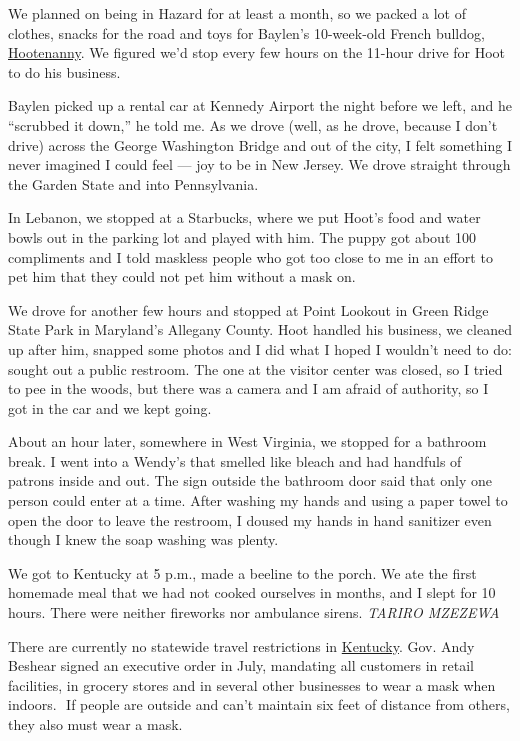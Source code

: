 We planned on being in Hazard for at least a month, so we packed a lot
of clothes, snacks for the road and toys for Baylen's 10-week-old French
bulldog, \href{https://www.instagram.com/hootboyblue/}{Hootenanny}. We
figured we'd stop every few hours on the 11-hour drive for Hoot to do
his business.

Baylen picked up a rental car at Kennedy Airport the night before we
left, and he ``scrubbed it down,'' he told me. As we drove (well, as he
drove, because I don't drive) across the George Washington Bridge and
out of the city, I felt something I never imagined I could feel --- joy
to be in New Jersey. We drove straight through the Garden State and into
Pennsylvania.

In Lebanon, we stopped at a Starbucks, where we put Hoot's food and
water bowls out in the parking lot and played with him. The puppy got
about 100 compliments and I told maskless people who got too close to me
in an effort to pet him that they could not pet him without a mask on.

We drove for another few hours and stopped at Point Lookout in Green
Ridge State Park in Maryland's Allegany County. Hoot handled his
business, we cleaned up after him, snapped some photos and I did what I
hoped I wouldn't need to do: sought out a public restroom. The one at
the visitor center was closed, so I tried to pee in the woods, but there
was a camera and I am afraid of authority, so I got in the car and we
kept going.

About an hour later, somewhere in West Virginia, we stopped for a
bathroom break. I went into a Wendy's that smelled like bleach and had
handfuls of patrons inside and out. The sign outside the bathroom door
said that only one person could enter at a time. After washing my hands
and using a paper towel to open the door to leave the restroom, I doused
my hands in hand sanitizer even though I knew the soap washing was
plenty.

We got to Kentucky at 5 p.m., made a beeline to the porch. We ate the
first homemade meal that we had not cooked ourselves in months, and I
slept for 10 hours. There were neither fireworks nor ambulance sirens.
\emph{TARIRO MZEZEWA}

There are currently no statewide travel restrictions in
\href{https://www.nytimes.com/interactive/2020/us/kentucky-coronavirus-cases.html}{Kentucky}.
Gov. Andy Beshear signed an executive order in July, mandating all
customers in retail facilities​, in​ grocery stores and in several other
businesses to wear a mask when indoors. ​ If people are outside and
can't maintain six feet of distance from others, they also ​must wear a
mask.

